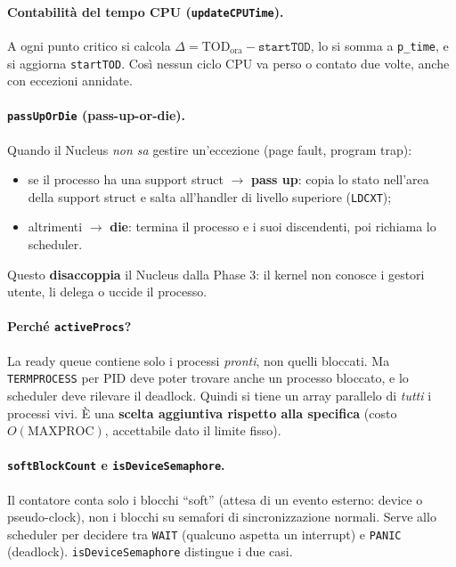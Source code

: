 \documentclass[11pt,a4paper]{article}
\newcommand{\code}[1]{\texttt{#1}}
\begin{document}
\paragraph{Contabilità del tempo CPU (\code{updateCPUTime}).} A ogni punto
critico si calcola $\Delta = \text{TOD}_\text{ora} - \code{startTOD}$, lo si
somma a \code{p\_time}, e si aggiorna \code{startTOD}. Così nessun ciclo CPU va
perso o contato due volte, anche con eccezioni annidate.

\paragraph{\code{passUpOrDie} (pass-up-or-die).} Quando il Nucleus \emph{non
sa} gestire un'eccezione (page fault, program trap):
\begin{itemize}
\item se il processo ha una support struct $\to$ \textbf{pass up}: copia lo
  stato nell'area della support struct e salta all'handler di livello superiore
  (\code{LDCXT});
\item altrimenti $\to$ \textbf{die}: termina il processo e i suoi discendenti,
  poi richiama lo scheduler.
\end{itemize}
Questo \textbf{disaccoppia} il Nucleus dalla Phase 3: il kernel non conosce i
gestori utente, li delega o uccide il processo.

\paragraph{Perché \code{activeProcs}?} La ready queue contiene solo i processi
\emph{pronti}, non quelli bloccati. Ma \code{TERMPROCESS} per PID deve poter
trovare anche un processo bloccato, e lo scheduler deve rilevare il deadlock.
Quindi si tiene un array parallelo di \emph{tutti} i processi vivi. È una
\textbf{scelta aggiuntiva rispetto alla specifica} (costo $O(\text{MAXPROC})$,
accettabile dato il limite fisso).

\paragraph{\code{softBlockCount} e \code{isDeviceSemaphore}.} Il contatore conta
solo i blocchi ``soft'' (attesa di un evento esterno: device o pseudo-clock),
non i blocchi su semafori di sincronizzazione normali. Serve allo scheduler per
decidere tra \code{WAIT} (qualcuno aspetta un interrupt) e \code{PANIC}
(deadlock). \code{isDeviceSemaphore} distingue i due casi.
\end{document}
